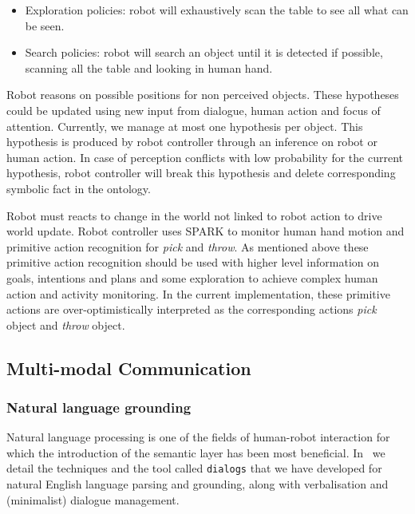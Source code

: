 \documentclass[preprint,5p]{elsarticle}
\begin{document}
\begin {itemize}
\item Exploration policies: robot will exhaustively scan the table to
  see all what can be seen.

\item Search policies: robot will search an object until it is
  detected if possible, scanning all the table and looking in human
  hand.

\end {itemize} 

Robot reasons on possible positions for non perceived
objects. These hypotheses could be updated using new input from dialogue, human
action and focus of attention. Currently, we manage at most one hypothesis per
object. This hypothesis is produced by robot controller through an inference on
robot or human action. In case of perception conflicts with low probability for
the current hypothesis, robot controller will break this hypothesis and delete
corresponding symbolic fact in the ontology.

Robot must reacts to change in the world not linked to robot
action to drive world update. Robot controller uses SPARK to monitor human hand
motion and primitive action recognition for \emph{pick} and \emph{throw}. As
mentioned above these primitive action recognition should be used with higher
level information on goals, intentions and plans and some exploration to
achieve complex human action and activity monitoring.  In the current
implementation, these primitive actions are over-optimistically interpreted as
the corresponding actions \emph{pick} object and \emph{throw} object.




\subsection{Multi-modal Communication}
\label{sect|com}

\subsubsection{Natural language grounding}

Natural language processing is one of the fields of human-robot interaction
for which the introduction of the semantic layer has been most beneficial.
In~\cite{Lemaignan2011a} we detail the techniques and the tool called
\texttt{dialogs} that we have developed for natural English language parsing and
grounding, along with verbalisation and (minimalist) dialogue management.
\end{document}
